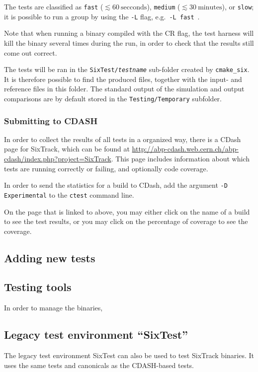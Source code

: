 \documentclass[english,BCOR=0mm,DIV=18]{scrartcl}
\begin{document}
The tests are classified as \texttt{fast} ($\lesssim 60~\mathrm{secconds}$), \texttt{medium} ($\lesssim 30~\mathrm{minutes}$), or \texttt{slow}; it is possible to run a group by using the \texttt{-L} flag, e.g.\ \texttt{-L fast}~.

Note that when running a binary compiled with the CR flag, the test harness will kill the binary several times during the run, in order to check that the results still come out correct.

The tests will be ran in the \texttt{SixTest/\textit{testname}} sub-folder created by \texttt{cmake\_six}.
It is therefore possible to find the produced files, together with the input- and reference files in this folder.
The standard output of the simulation and output comparisons are by default stored in the \texttt{Testing/Temporary} subfolder.

\subsubsection{Submitting to CDASH}
In order to collect the results of all tests in a organized way, there is a CDash page for SixTrack, which can be found at \url{http://abp-cdash.web.cern.ch/abp-cdash/index.php?project=SixTrack}.
This page includes information about which tests are running correctly or failing, and optionally code coverage.

In order to send the statistics for a build to CDash, add the argument \texttt{-D Experimental} to the \texttt{ctest} command line.

On the page that is linked to above, you may either click on the name of a build to see the test results, or you may click on the percentage of coverage to see the coverage.

\subsection{Adding new tests}

\subsection{Testing tools}
In order to manage the binaries, 

\subsection{Legacy test environment ``SixTest''}

The legacy test environment SixTest can also be used to test SixTrack binaries.
It uses the same tests and canonicals as the CDASH-based tests.
\end{document}
